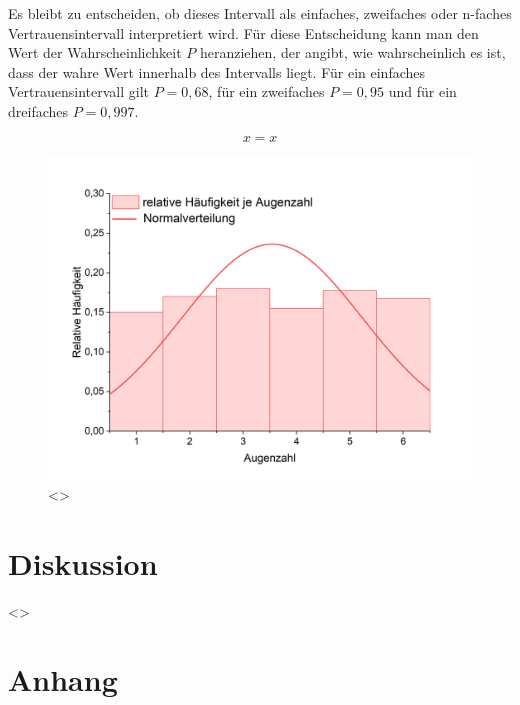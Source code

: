 \documentclass[a4paper,12pt]{article}
\begin{document}
Es bleibt zu entscheiden, ob dieses Intervall als einfaches, zweifaches oder n-faches Vertrauensintervall
interpretiert wird. Für diese Entscheidung kann man den Wert der Wahrscheinlichkeit $P$ heranziehen, der angibt,
wie wahrscheinlich es ist, dass der wahre Wert innerhalb des Intervalls liegt. Für ein einfaches Vertrauensintervall
gilt $P = 0,68$, für ein zweifaches $P = 0,95$ und für ein dreifaches $P = 0,997$. %




\begin{equation}
    \label{Gl1}
    x = x
\end{equation}

\vspace{0,5cm}


\begin{figure}[H]
    \label{AbbAuswertung1}
    \centering
    \includegraphics[width=\textwidth]{bilder/Diagramm1.png}        %
    \caption{<>}                                                    %
\end{figure}

\section{Diskussion}

<>

\section{Anhang}
\label{sec:Anhang}
\end{document}
